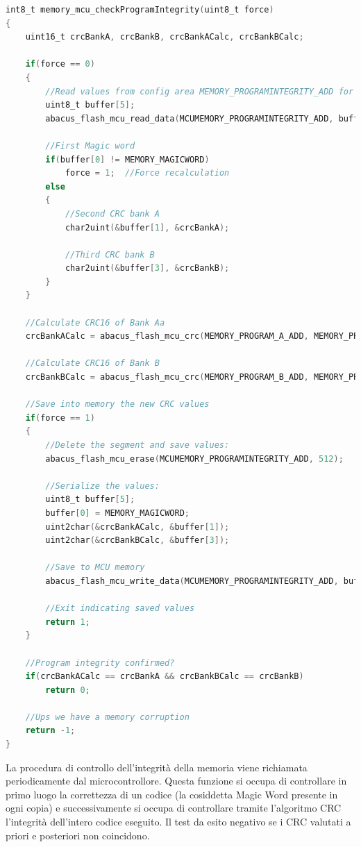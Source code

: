\documentclass[LaM,binding=0.6cm]{../sapthesis}
\begin{document}
\begin{lstlisting}[language=C]
    int8_t memory_mcu_checkProgramIntegrity(uint8_t force)
{
    uint16_t crcBankA, crcBankB, crcBankACalc, crcBankBCalc;

    if(force == 0)
    {
        //Read values from config area MEMORY_PROGRAMINTEGRITY_ADD for banks A and B
        uint8_t buffer[5];
        abacus_flash_mcu_read_data(MCUMEMORY_PROGRAMINTEGRITY_ADD, buffer, 5);

        //First Magic word
        if(buffer[0] != MEMORY_MAGICWORD)
            force = 1;  //Force recalculation
        else
        {
            //Second CRC bank A
            char2uint(&buffer[1], &crcBankA);

            //Third CRC bank B
            char2uint(&buffer[3], &crcBankB);
        }
    }

    //Calculate CRC16 of Bank Aa
    crcBankACalc = abacus_flash_mcu_crc(MEMORY_PROGRAM_A_ADD, MEMORY_PROGRAM_A_SIZE);

    //Calculate CRC16 of Bank B
    crcBankBCalc = abacus_flash_mcu_crc(MEMORY_PROGRAM_B_ADD, MEMORY_PROGRAM_B_SIZE);

    //Save into memory the new CRC values
    if(force == 1)
    {
        //Delete the segment and save values:
        abacus_flash_mcu_erase(MCUMEMORY_PROGRAMINTEGRITY_ADD, 512);

        //Serialize the values:
        uint8_t buffer[5];
        buffer[0] = MEMORY_MAGICWORD;
        uint2char(&crcBankACalc, &buffer[1]);
        uint2char(&crcBankBCalc, &buffer[3]);

        //Save to MCU memory
        abacus_flash_mcu_write_data(MCUMEMORY_PROGRAMINTEGRITY_ADD, buffer, 5);

        //Exit indicating saved values
        return 1;
    }

    //Program integrity confirmed?
    if(crcBankACalc == crcBankA && crcBankBCalc == crcBankB)
        return 0;

    //Ups we have a memory corruption
    return -1;
}
\end{lstlisting}

La procedura di controllo dell'integrità della memoria viene richiamata periodicamente dal microcontrollore. Questa funzione si occupa di controllare in primo luogo la correttezza di un codice (la cosiddetta Magic Word presente in ogni copia) e successivamente si occupa di controllare tramite l'algoritmo CRC l'integrità dell'intero codice eseguito. Il test da esito negativo se i CRC valutati a priori e posteriori non coincidono.
\end{document}
